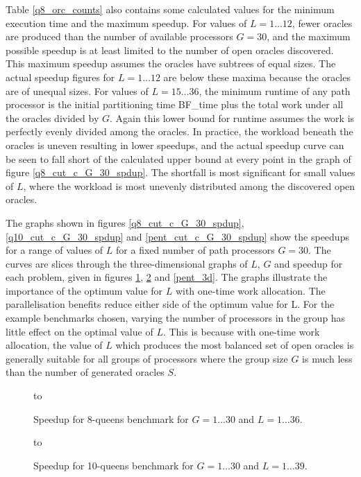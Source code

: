 Table \ref{q8_orc_counts} also contains some calculated values for the minimum execution
time and the maximum speedup.  For values of $L=1\ldots 12$, fewer oracles are produced
than the number of available processors $G=30$, and the maximum possible speedup is
at least limited to the number of open oracles discovered.  This maximum speedup assumes
the oracles have subtrees of equal sizes.  The actual speedup figures for $L=1\ldots 12$
are below these maxima because the oracles are of unequal sizes.  For values of 
$L=15\ldots 36$, the minimum runtime of any path processor is the initial partitioning
time BF\_{}time plus the total work under all the oracles divided by $G$.  Again this
lower bound for runtime assumes the work is perfectly evenly divided among the oracles.
In practice, the workload beneath the oracles is uneven resulting in lower speedups, and
the actual speedup curve can be seen to fall short of the calculated upper bound at every
point in the graph of figure \ref{q8_cut_c_G_30_spdup}.  The shortfall is most
significant for small values of $L$, where the workload is most unevenly distributed
among the discovered open oracles.

The graphs shown in figures \ref{q8_cut_c_G_30_spdup}, \ref{q10_cut_c_G_30_spdup} and 
\ref{pent_cut_c_G_30_spdup} show the speedups for a range of values of $L$ for a fixed
number of path processors $G=30$.  The curves are slices through the three-dimensional
graphs of $L$, $G$ and speedup for each problem, given in figures
\ref{q8_3d}, \ref{q10_3d} and \ref{pent_3d}.  The graphs illustrate the importance of the
optimum value for $L$ with one-time work allocation.
The parallelisation benefits reduce either side of the optimum value for L.  For the example
benchmarks chosen, varying the number of processors in the group has little effect on the
optimal value of $L$.  This is because with one-time work allocation, the value of $L$ which
produces the most balanced set of open oracles is generally suitable for all groups of 
processors where the group size $G$ is much less than the number of generated oracles $S$.

\begin{figure}[htb]
\vspace{5mm} \hbox to 
\caption{Speedup for 8-queens benchmark for $G=1\ldots 30$ and $L=1\ldots 36$.}
\vspace{5mm}
\label{q8_3d}
\end{figure}

\begin{figure}[htb]
\vspace{5mm} \hbox to 
\caption{Speedup for 10-queens benchmark for $G=1\ldots 30$ and $L=1\ldots 39$.}
\vspace{5mm}
\label{q10_3d}
\end{figure}


